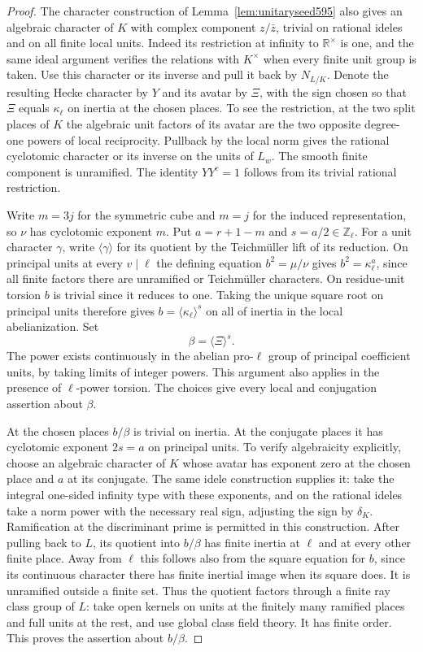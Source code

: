 \documentclass[a4paper,11pt]{article}
\theoremstyle{definition}
\theoremstyle{remark}
\newcommand{\ZZ}{\mathbb Z}\newcommand{\ord}{\operatorname{ord}}
\numberwithin{equation}{section}
\begin{document}
\begin{proof}
The character construction of Lemma~\ref{lem:unitaryseed595}
also gives an algebraic character of \(K\) with complex
component \(z/\bar z\), trivial on rational ideles and
on all finite local units. Indeed its restriction at
infinity to \(\mathbb R^\times\) is one, and the same
ideal argument verifies the relations with \(K^\times\)
when every finite unit group is taken. Use this character
or its inverse and pull it back by \(N_{L/K}\). Denote
the resulting Hecke character by \(Y\) and its avatar by
\(\Xi\), with the sign chosen so that \(\Xi\) equals
\(\kappa_\ell\) on inertia at the chosen places.
To see the restriction, at the two split places of \(K\)
the algebraic unit factors of its avatar are the two
opposite degree-one powers of local reciprocity. Pullback
by the local norm gives the rational cyclotomic character
or its inverse on the units of \(L_w\). The smooth
finite component is unramified. The identity
\(YY^c=1\) follows from its trivial rational restriction.

Write \(m=3j\) for the symmetric cube and \(m=j\) for the
induced representation, so \(\nu\) has cyclotomic exponent
\(m\). Put \(a=r+1-m\) and \(s=a/2\in\ZZ_\ell\). For a
unit character \(\gamma\), write \(\langle\gamma\rangle\)
for its quotient by the Teichm\"uller lift of its reduction.
On principal units at every \(v\mid\ell\) the defining
equation \(b^2=\mu/\nu\) gives \(b^2=\kappa_\ell^a\),
since all finite factors there are unramified or
Teichm\"uller characters. On residue-unit torsion \(b\)
is trivial since it reduces to one. Taking the unique
square root on principal units therefore gives
\(b=\langle\kappa_\ell\rangle^s\) on all of inertia
in the local abelianization. Set
\[
                          \beta=\langle\Xi\rangle^s.
\]
The power exists continuously in the abelian pro-\(\ell\)
group of principal coefficient units, by taking limits of
integer powers. This argument also applies in the presence
of \(\ell\)-power torsion. The choices give every local and
conjugation assertion about \(\beta\).

At the chosen places \(b/\beta\) is trivial on inertia.
At the conjugate places it has cyclotomic exponent \(2s=a\)
on principal units. To verify algebraicity explicitly,
choose an algebraic character of \(K\) whose avatar has
exponent zero at the chosen place and \(a\) at its conjugate.
The same idele construction supplies it: take the integral
one-sided infinity type with these exponents, and on the
rational ideles take a norm power with the necessary real
sign, adjusting the sign by \(\delta_K\). Ramification at
the discriminant prime is permitted in this construction.
After pulling back to \(L\), its quotient into \(b/\beta\)
has finite inertia at \(\ell\) and at every other finite
place. Away from \(\ell\) this follows also from the square
equation for \(b\), since its continuous character there
has finite inertial image when its square does. It is
unramified outside a finite set. Thus the quotient factors
through a finite ray class group of \(L\): take open kernels
on units at the finitely many ramified places and full units
at the rest, and use global class field theory. It has finite
order. This proves the assertion about \(b/\beta\).


\end{proof}
\end{document}
